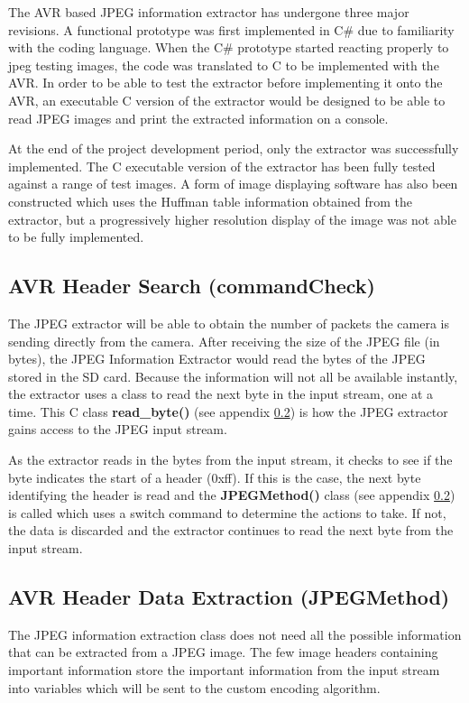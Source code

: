 The AVR based JPEG information extractor has undergone
three major revisions. A functional prototype was first
implemented in C\# due to familiarity with the coding language.
When the C\# prototype started reacting properly to 
jpeg testing images, the code was translated to C to be
implemented with the AVR. In order to be able to test
the extractor before implementing it onto the AVR, an 
executable C version of the extractor would be designed
to be able to read JPEG images and print the extracted
information on a console.

At the end of the project development period, only the 
extractor was successfully implemented. The C executable 
version of the extractor has been fully tested against 
a range of test images. A form of image displaying 
software has also been constructed which uses the 
Huffman table information obtained from the extractor, 
but a progressively higher resolution display of 
the image was not able to be fully implemented.

\subsection{AVR Header Search (commandCheck)}

The JPEG extractor will be able to obtain the 
number of packets the camera is sending directly from the camera.
After receiving the size of the JPEG file (in bytes), 
the JPEG Information Extractor would read the bytes of the JPEG stored in the SD card. 
Because the information will not all be available instantly, 
the extractor uses a class to read the next byte in the input stream, one at a time. 
This C class \textbf{read\_byte()} (see appendix \ref{}) is how the JPEG extractor 
gains access to the JPEG input stream. 

As the extractor reads in the bytes from the input stream, it checks to see if the byte indicates the start of a header (0xff). 
If this is the case, the next byte identifying the header is read and the \textbf{JPEGMethod()} class  (see appendix \ref{}) is 
called which uses a switch command to determine the actions to take. 
If not, the data is discarded and the extractor continues 
to read the next byte from the input stream. 

\subsection{AVR Header Data Extraction (JPEGMethod)}

The JPEG information extraction class does not need all the possible information that can be extracted from a JPEG image. 
The few image headers containing important information store the important information from the input stream into 
variables which will be sent to the custom encoding algorithm. 

